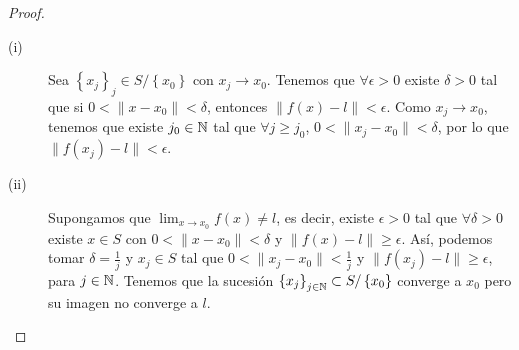 \begin{proof}
\begin{description}
	\item[(i)] Sea $\displaystyle \left\{ x_{j}\right\} _{j} \in S / \left\{ x_{0}\right\}  $ con $\displaystyle x_{j} \to x_{0} $. Tenemos que $\displaystyle \forall \epsilon > 0 $ existe $\displaystyle \delta > 0 $ tal que si $\displaystyle  0 < \| x - x_{0}\| < \delta  $, entonces $\displaystyle \|f\left(x\right)-l\| < \epsilon  $. Como $\displaystyle x_{j} \to x_{0} $, tenemos que existe $\displaystyle j _{0} \in \mathbb{N} $ tal que $\displaystyle \forall j \geq j_{0} $, $\displaystyle 0 < \|x_{j}-x_{0}\| < \delta  $, por lo que $\displaystyle \| f\left(x_{j}\right)-l \| < \epsilon  $. 
	\item[(ii)] Supongamos que $\displaystyle \lim_{x \to x_{0}}f\left(x\right) \neq l $, es decir, existe $\displaystyle \epsilon > 0 $ tal que $\displaystyle \forall \delta > 0 $ existe $\displaystyle x \in S $ con $\displaystyle 0 < \|x - x_{0}\|< \delta  $ y $\displaystyle \|f\left(x\right)-l\| \geq \epsilon  $. 
		Así, podemos tomar $\displaystyle \delta = \frac{1}{j} $ y $\displaystyle x_{j} \in S $ tal que $\displaystyle 0< \|x_{j}-x_{0}\| < \frac{1}{j} $ y $\displaystyle \|f\left(x_{j}\right)-l\| \geq \epsilon  $, para $\displaystyle j \in \mathbb{N} $. Tenemos que la sucesión $\displaystyle \left\{ x_{j}\right\} _{j\in \mathbb{N}} \subset S/ \left\{ x_{0}\right\}  $ converge a $\displaystyle x_{0} $ pero su imagen no converge a $\displaystyle l $.
\end{description}

\end{proof}

